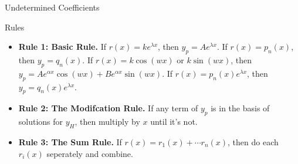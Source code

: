 \documentclass{article}
\begin{document}
\begin{multicols*}{3}
\begin{blackbox}{Undetermined Coefficients}
\begin{pinkbox}{Rules}
        \begin{itemize}[leftmargin=5pt]
            \item \textbf{Rule 1: Basic Rule.} If $r(x) = ke^{\lambda x}$, then $y_p = Ae^{\lambda x}$. If $r(x) = p_n(x)$, then $y_p = q_n(x)$. If $r(x) = k\cos(wx)$ or $k\sin(wx)$, then $y_p = Ae^{\alpha x}\cos(wx) + Be^{\alpha x}\sin(wx)$. If $r(x) = p_n(x)e^{\lambda x}$, then $y_p = q_n(x)e^{\lambda x}$.
            \item \textbf{Rule 2: The Modifcation Rule.} If any term of $y_p$ is in the basis of solutions for $y_H$, then multiply by $x$ until it's not.
            \item \textbf{Rule 3: The Sum Rule.} If $r(x) = r_1(x) + \cdots r_n(x)$, then do each $r_i(x)$ seperately and combine.
        \end{itemize}


\end{pinkbox}
\end{blackbox}
\end{multicols*}
\end{document}

